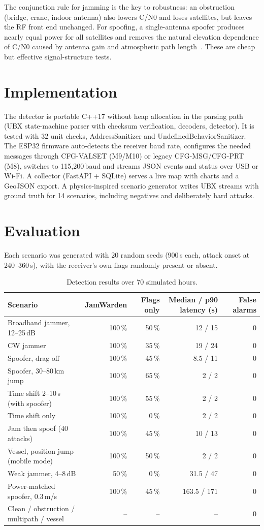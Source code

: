 \documentclass[11pt,a4paper]{article}
\begin{document}
The conjunction rule for jamming is the key to robustness: an obstruction (bridge, crane, indoor antenna) also
lowers C/N0 and loses satellites, but leaves the RF front end unchanged. For spoofing, a single-antenna
spoofer produces nearly equal power for all satellites and removes the natural elevation dependence of C/N0
caused by antenna gain and atmospheric path length~\cite{misra}. These are cheap but effective
signal-structure tests.

\section{Implementation}
The detector is portable C++17 without heap allocation in the parsing path (UBX state-machine parser with
checksum verification, decoders, detector). It is tested with 32 unit checks, AddressSanitizer and
UndefinedBehaviorSanitizer. The ESP32 firmware auto-detects the receiver baud rate, configures the needed
messages through CFG-VALSET (M9/M10) or legacy CFG-MSG/CFG-PRT (M8), switches to 115{,}200\,baud and streams
JSON events and status over USB or Wi-Fi. A collector (FastAPI + SQLite) serves a live map with charts and a
GeoJSON export. A physics-inspired scenario generator writes UBX streams with ground truth for 14 scenarios,
including negatives and deliberately hard attacks.

\section{Evaluation}
Each scenario was generated with 20 random seeds (900\,s each, attack onset at 240--360\,s), with the receiver's
own flags randomly present or absent.

\begin{table}[h]
\centering\small
\begin{tabular}{@{}lrrrr@{}}
\toprule
Scenario & JamWarden & Flags only & Median / p90 latency (s) & False alarms \\ \midrule
Broadband jammer, 12--25\,dB & 100\,\% & 50\,\% & 12 / 15 & 0 \\
CW jammer & 100\,\% & 35\,\% & 19 / 24 & 0 \\
Spoofer, drag-off & 100\,\% & 45\,\% & 8.5 / 11 & 0 \\
Spoofer, 30--80\,km jump & 100\,\% & 65\,\% & 2 / 2 & 0 \\
Time shift 2--10\,s (with spoofer) & 100\,\% & 55\,\% & 2 / 2 & 0 \\
Time shift only & 100\,\% & 0\,\% & 2 / 2 & 0 \\
Jam then spoof (40 attacks) & 100\,\% & 45\,\% & 10 / 13 & 0 \\
Vessel, position jump (mobile mode) & 100\,\% & 50\,\% & 2 / 2 & 0 \\
Weak jammer, 4--8\,dB & 50\,\% & 0\,\% & 31.5 / 47 & 0 \\
Power-matched spoofer, 0.3\,m/s & 100\,\% & 45\,\% & 163.5 / 171 & 0 \\
Clean / obstruction / multipath / vessel & -- & -- & -- & 0 \\ \bottomrule
\end{tabular}
\caption{Detection results over 70 simulated hours.}
\end{table}
\end{document}
